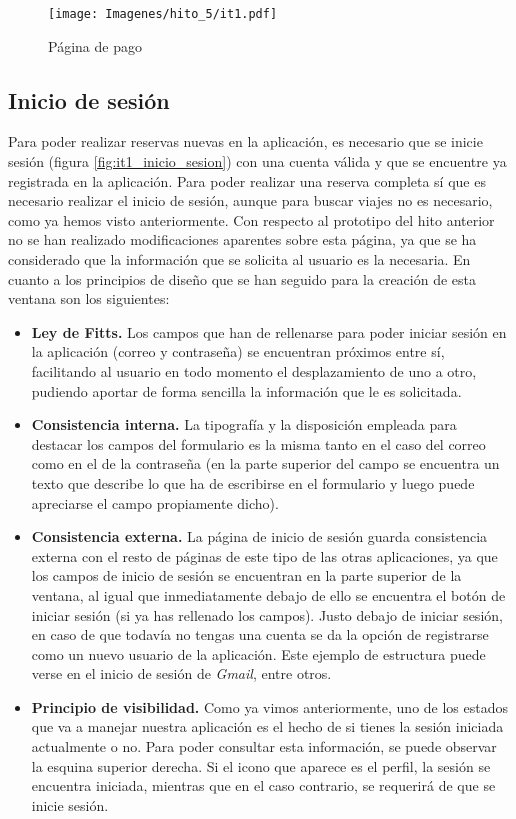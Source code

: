 \begin{figure}[H]
    \centering
    \texttt{[image: Imagenes/hito\_5/it1.pdf]}
    \caption{Página de pago}
    \label{fig:it1_pago}
\end{figure}

\subsection*{Inicio de sesión}

Para poder realizar reservas nuevas en la aplicación, es necesario que se inicie sesión (figura \ref{fig:it1_inicio_sesion}) con
una cuenta válida y que se encuentre ya registrada en la aplicación. Para poder realizar una
reserva completa sí que es necesario realizar el inicio de sesión, aunque para buscar viajes
no es necesario, como ya hemos visto anteriormente. Con respecto al prototipo del hito anterior
no se han realizado modificaciones aparentes sobre esta página, ya que se ha considerado que
la información que se solicita al usuario es la necesaria. En cuanto a los principios de diseño
que se han seguido para la creación de esta ventana son los siguientes:

\begin{itemize}
    \item \textbf{Ley de Fitts.} Los campos que han de rellenarse para poder iniciar sesión en la
        aplicación (correo y contraseña) se encuentran próximos entre sí, facilitando al
        usuario en todo momento el desplazamiento de uno a otro, pudiendo aportar de forma
        sencilla la información que le es solicitada.
    \item \textbf{Consistencia interna.} La tipografía y la disposición empleada para destacar los campos
        del formulario es la misma tanto en el caso del correo como en el de la contraseña (en
        la parte superior del campo se encuentra un texto que describe lo que ha de escribirse
        en el formulario y luego puede apreciarse el campo propiamente dicho).
    \item \textbf{Consistencia externa.} La página de inicio de sesión guarda consistencia externa con
        el resto de páginas de este tipo de las otras aplicaciones, ya que los campos de inicio
        de sesión se encuentran en la parte superior de la ventana, al igual que inmediatamente
        debajo de ello se encuentra el botón de iniciar sesión (si ya has rellenado los campos).
        Justo debajo de iniciar sesión, en caso de que todavía no tengas una cuenta se da la
        opción de registrarse como un nuevo usuario de la aplicación. Este ejemplo de estructura
        puede verse en el inicio de sesión de \textit{Gmail}, entre otros.
    \item \textbf{Principio de visibilidad.} Como ya vimos anteriormente, uno de los estados que va a
        manejar nuestra aplicación es el hecho de si tienes la sesión iniciada actualmente o no.
        Para poder consultar esta información, se puede observar la esquina superior derecha. Si
        el icono que aparece es el perfil, la sesión se encuentra iniciada, mientras que en el
        caso contrario, se requerirá de que se inicie sesión.
\end{itemize}

